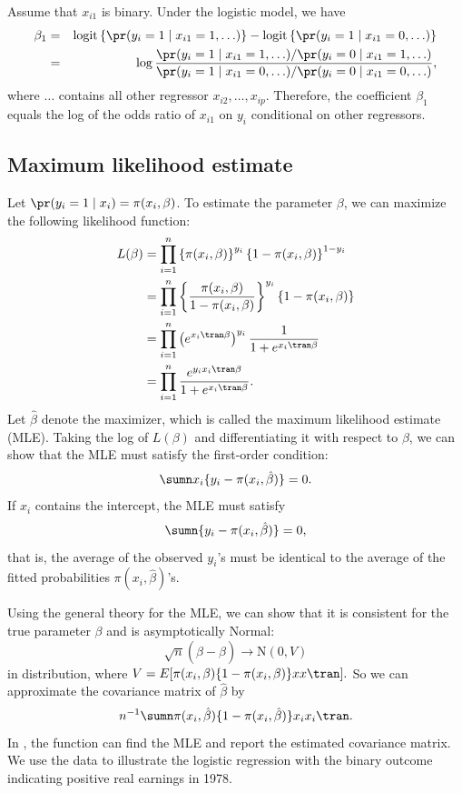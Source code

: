 Assume that $x_{i1}$ is binary. 
Under the logistic model, we have
\begin{eqnarray*}
\beta_1 &=& \text{logit}\left\{ \pr(y_{i}=1\mid x_{i1} = 1,  \ldots )\right\}  - \text{logit}\left\{ \pr(y_{i}=1\mid x_{i1} = 0,\ldots)\right\}   \\
&=& \log \frac{  \pr(y_{i}=1\mid x_{i1} = 1, \ldots)/\pr(y_{i}=0\mid x_{i1} = 1, \ldots)     }
{  \pr(y_{i}=1\mid x_{i1} = 0, \ldots)/\pr(y_{i}=0\mid x_{i1} = 0, \ldots)    } ,
\end{eqnarray*}
where $\ldots$ contains all other regressor $ x_{i2}, \ldots, x_{ip} $.
Therefore, the coefficient $\beta_1$ equals the log of the odds ratio of $x_{i1}$ on $y_i$ conditional on other regressors. 



\subsection{Maximum likelihood estimate}\label{sec::mle-logistic}


Let $\pr(y_{i}=1\mid x_{i}) = \pi(x_{i},\beta)$. 
To estimate the parameter $\beta$, we can maximize the following likelihood function:
\begin{align*}
L(\beta)  
&=\prod_{i=1}^{n}\left\{ \pi(x_{i},\beta)\right\} ^{y_{i}}\left\{ 1-\pi(x_{i},\beta)\right\} ^{1-y_{i}} \\
& =\prod_{i=1}^{n}\left\{ \frac{\pi(x_{i},\beta)}{1-\pi(x_{i},\beta)}\right\} ^{y_{i}}\left\{ 1-\pi(x_{i},\beta)\right\} \\
 & =\prod_{i=1}^{n}\left(e^{x_{i} \tran \beta}\right)^{y_{i}}\frac{1}{1+e^{x_{i} \tran \beta}}\\
 & =\prod_{i=1}^{n}\frac{e^{y_{i}x_{i} \tran \beta}}{1+e^{x_{i} \tran \beta}}.
\end{align*}
Let $\hat{\beta}$ denote the maximizer, which is called the maximum likelihood estimate (MLE). Taking the log of $L(\beta)  $ and differentiating it with respect to $\beta$, we can show that the MLE must satisfy the first-order condition:
$$
\sumn  x_i  \{ y_i - \pi(x_{i}, \hat\beta)\} = 0.
$$
If $x_i$ contains the intercept, the MLE must satisfy 
$$
\sumn    \{ y_i - \pi(x_{i}, \hat\beta)\} = 0,
$$ 
that is, the average of the observed $y_i$'s must be identical to the average of the fitted probabilities $ \pi(x_{i}, \hat\beta)$'s.


Using the general theory for the MLE, we can show that it is consistent for the true parameter $\beta$ and is asymptotically Normal:
$$
\sqrt{n}( \hat{\beta} -  \beta) \rightarrow \text{N}(0, V)
$$
in distribution, where 
$
V = E [  \pi(x_{i},\beta) \{1-  \pi(x_{i},\beta)\} x x\tran   ].
$
So we can approximate the covariance matrix of $\hat{\beta} $ by 
$$
n^{-1} \sumn \pi(x_{i}, \hat\beta) \{1-  \pi(x_{i},\hat\beta)\}   x_i x_i\tran.
$$
In , the  function can find the MLE and report the estimated covariance matrix. We use the  data to illustrate the logistic regression with the binary outcome indicating positive real earnings in 1978.



